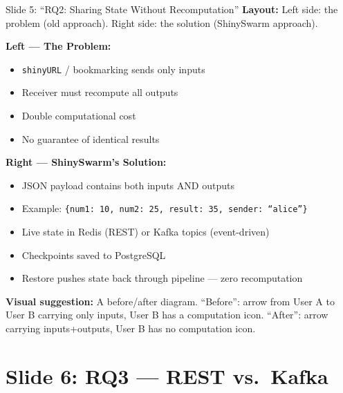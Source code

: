 \documentclass[12pt,a4paper]{article}
\begin{document}
\begin{slidebox}{Slide 5: ``RQ2: Sharing State Without Recomputation''}
\textbf{Layout:} Left side: the problem (old approach). Right side: the solution (ShinySwarm approach).

\textbf{Left --- The Problem:}
\begin{itemize}[nosep]
  \item \texttt{shinyURL} / bookmarking sends only inputs
  \item Receiver must recompute all outputs
  \item Double computational cost
  \item No guarantee of identical results
\end{itemize}

\textbf{Right --- ShinySwarm's Solution:}
\begin{itemize}[nosep]
  \item JSON payload contains both inputs AND outputs
  \item Example: \texttt{\{num1: 10, num2: 25, result: 35, sender: ``alice''\}}
  \item Live state in Redis (REST) or Kafka topics (event-driven)
  \item Checkpoints saved to PostgreSQL
  \item Restore pushes state back through pipeline --- zero recomputation
\end{itemize}

\textbf{Visual suggestion:} A before/after diagram. ``Before'': arrow from User A to User B carrying only inputs, User B has a computation icon. ``After'': arrow carrying inputs+outputs, User B has no computation icon.
\end{slidebox}

\section{Slide 6: RQ3 --- REST vs.\ Kafka}
\end{document}
